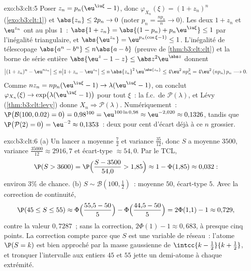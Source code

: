 \begin{solution}{exo:b3:clt:5}
Poser $z_n = p_n(\eu^{\iu\xi} - 1)$, donc $\varphi_{X_n}(\xi) =
(1 + z_n)^n$ (\cref{exo:b3:clt:1}) et $\abs{z_n} \leq 2p_n
\to 0$ (noter $p_n = \frac{np_n}n \to 0$). Les deux $1 + z_n$
et $\eu^{z_n}$ ont  au plus $1$~: $\abs{1 + z_n} =
\abs{(1 - p_n) + p_n\eu^{\iu\xi}} \leq 1$ par l'inégalité
triangulaire, et $\abs{\eu^{z_n}} = \eu^{p_n(\cos\xi - 1)}
\leq 1$. L'inégalité de télescopage $\abs{a^n - b^n} \leq
n\abs{a - b}$ (preuve de \cref{thm:b3:clt:clt}) et la borne
de série entière $\abs{\eu^z - 1 - z} \leq
\abs z^2\eu^{\abs z}$ donnent
\[
\bigl|(1 + z_n)^n - \eu^{nz_n}\bigr| \leq n\bigl|1 + z_n -
\eu^{z_n}\bigr| \leq n\,\abs{z_n}^2\,\eu^{\abs{z_n}} \leq
4\eu^2\,np_n^2 = 4\eu^2\,(np_n)\,p_n \longrightarrow 0 .
\]
Comme $nz_n = np_n(\eu^{\iu\xi} - 1) \to
\lambda(\eu^{\iu\xi} - 1)$, on conclut $\varphi_{X_n}(\xi)
\to \exp\bigl(\lambda(\eu^{\iu\xi} - 1)\bigr)$ pour tout
$\xi$~: la f.c.\ de $\mathcal P(\lambda)$, et Lévy
(\cref{thm:b3:clt:levy}) donne $X_n \Rightarrow \mathcal
P(\lambda)$. Numériquement~: $\P\bigl(\mathcal B(100, 0.02) =
0\bigr) = 0{,}98^{100} = \eu^{100\ln 0{,}98} \approx
\eu^{-2{,}020} \approx 0{,}1326$, tandis que $\P\bigl(\mathcal
P(2) = 0\bigr) = \eu^{-2} \approx 0{,}1353$~: deux pour cent
d'écart déjà à ce $n$ grossier.
\end{solution}

\begin{solution}{exo:b3:clt:6}
(a) Un lancer a moyenne $\frac72$ et variance $\frac{35}{12}$,
donc $S$ a moyenne $3500$, variance $\frac{35000}{12} \approx
2916{,}7$ et écart-type $\approx 54{,}0$. Par le TCL,
\[
\P(S > 3600) = \P\Bigl(\frac{S - 3500}{54{,}0} > 1{,}85\Bigr)
\approx 1 - \Phi(1{,}85) \approx 0{,}032 :
\]
environ $3\%$ de chance.
(b) $S \sim \mathcal B(100, \frac12)$~: moyenne $50$,
écart-type $5$. Avec la correction de continuité,
\[
\P(45 \leq S \leq 55) \approx
\Phi\Bigl(\frac{55{,}5 - 50}{5}\Bigr) -
\Phi\Bigl(\frac{44{,}5 - 50}{5}\Bigr) = 2\Phi(1{,}1) - 1
\approx 0{,}729,
\]
contre la valeur  $0{,}7287$~; sans la correction,
$2\Phi(1) - 1 \approx 0{,}683$, à presque cinq points. La
correction compte parce que $S$ est une variable de réseau~:
l'atome $\P(S = k)$ est bien approché par la masse
gaussienne de $\intcc{k - \frac12}{k + \frac12}$, et
tronquer l'intervalle aux entiers $45$ et $55$ jette un
demi-atome à chaque extrémité.
\end{solution}


